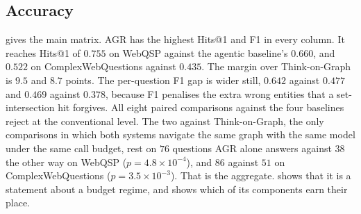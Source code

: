 \subsection{Accuracy}\label{sec:accuracy}

 gives the main matrix. AGR has the highest Hits@1 and F1
in every column. It reaches Hits@1 of $0.755$ on WebQSP against the
agentic baseline's $0.660$, and $0.522$ on ComplexWebQuestions against
$0.435$. The margin over Think-on-Graph is $9.5$ and $8.7$ points. The
per-question F1 gap is wider still, $0.642$ against $0.477$ and $0.469$
against $0.378$, because F1 penalises the extra wrong entities that a
set-intersection hit forgives. All eight paired comparisons against the
four baselines reject at the conventional level. The two against
Think-on-Graph, the only comparisons in which both systems navigate the
same graph with the same model under the same call budget, rest on $76$
questions AGR alone answers against $38$ the other way on WebQSP ($p =
4.8 \times 10^{-4}$), and $86$ against $51$ on ComplexWebQuestions ($p =
3.5 \times 10^{-3}$). That is the aggregate.  shows
that it is a statement about a budget regime, and 
shows which of its components earn their place.

